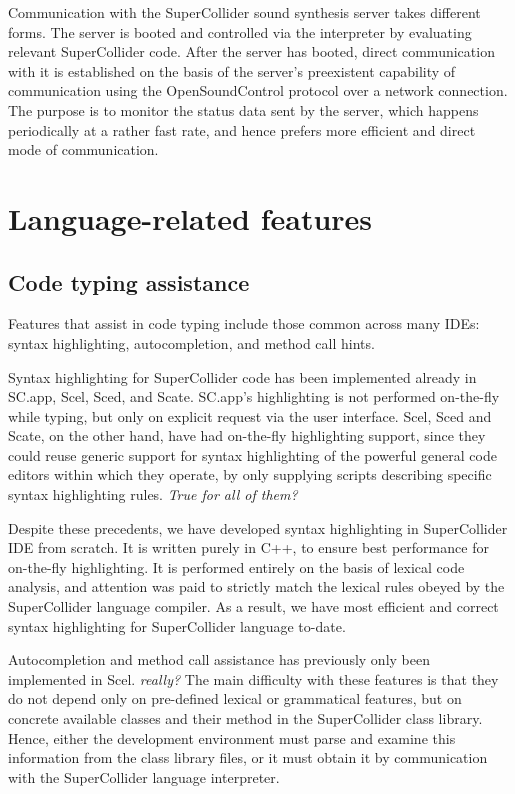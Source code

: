 \documentclass[11pt,a4paper]{article}
\begin{document}
Communication with the SuperCollider sound synthesis server takes different forms. The server is
booted and controlled via the interpreter by evaluating relevant SuperCollider code. After the
server has booted, direct communication with it is established on the basis of the server's
preexistent capability of communication using the OpenSoundControl protocol over a network
connection. The purpose is to monitor the status data sent by the server, which happens periodically
at a rather fast rate, and hence prefers more efficient and direct mode of communication.

\section{Language-related features}

\subsection{Code typing assistance}

Features that assist in code typing include those common across many IDEs: syntax highlighting,
autocompletion, and method call hints.

Syntax highlighting for SuperCollider code has been implemented already in SC.app, Scel, Sced, and
Scate. SC.app's highlighting is not performed on-the-fly while typing, but only on explicit request
via the user interface. Scel, Sced and Scate, on the other hand, have had on-the-fly highlighting
support, since they could reuse generic support for syntax highlighting of the powerful general code
editors within which they operate, by only supplying scripts describing specific syntax highlighting
rules. \emph{True for all of them?}

Despite these precedents, we have developed syntax highlighting in SuperCollider IDE from scratch.
It is written purely in C++, to ensure best performance for on-the-fly highlighting. It is performed
entirely on the basis of lexical code analysis, and attention was paid to strictly match the lexical
rules obeyed by the SuperCollider language compiler. As a result, we have most efficient and correct
syntax highlighting for SuperCollider language to-date.

Autocompletion and method call assistance has previously only been implemented in Scel. \emph{really?}
The main difficulty with these features is that they do not depend only on pre-defined lexical or
grammatical features, but on concrete available classes and their method in the SuperCollider class
library. Hence, either the development environment must parse and examine this information from the
class library files, or it must obtain it by communication with the SuperCollider language
interpreter.
\end{document}
